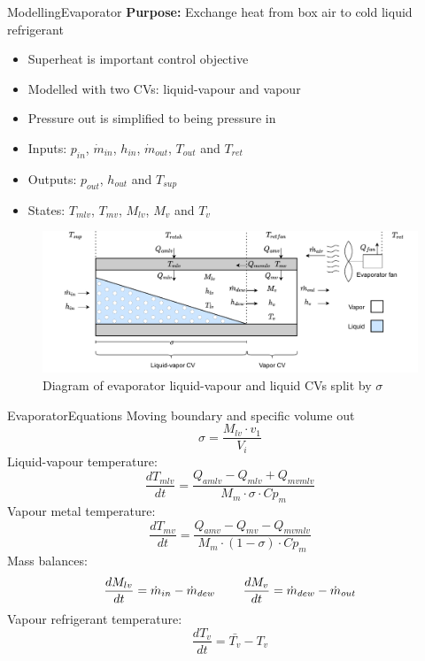 
\begin{frame}{Modelling}{Evaporator}
	\textbf{Purpose:} Exchange heat from box air to cold liquid refrigerant
	\begin{itemize}
		\item Superheat is important control objective
		\item Modelled with two CVs: liquid-vapour and vapour
		\item Pressure out is simplified to being pressure in
		\item Inputs: $p_{in}$, $\dot{m}_{in}$, $h_{in}$, $\dot{m}_{out}$, $T_{out}$ and $T_{ret}$
		\item Outputs: $p_{out}$, $h_{out}$ and $T_{sup}$
		\item States: $T_{mlv}$, $T_{mv}$, $M_{lv}$, $M_{v}$ and $T_{v}$
	\end{itemize}
	\begin{figure}[h!]
		\centering
		\includegraphics[width=1\textwidth]{../Graphics/Evaporator_CV_diagram.pdf}
		\caption{Diagram of evaporator liquid-vapour and liquid CVs split by $\sigma$}
		\label{fig:evap_CV}
	\end{figure}

\end{frame}

\begin{frame}{Evaporator}{Equations}
	Moving boundary and specific volume out
	\begin{equation}
		\sigma = \frac{M_{lv} \cdot v_1}{V_i} \label{eq:Evaporator_boundary}
	\end{equation}
	Liquid-vapour temperature:
	\begin{equation}
		\frac{dT_{mlv}}{dt}  = \frac{Q_{amlv}-Q_{mlv} + Q_{mvmlv}}{M_m \cdot \sigma \cdot Cp_m} \label{eq:evap_dT_ml}
	\end{equation}
	Vapour metal temperature:
	\begin{equation}
		\frac{dT_{mv}}{dt} = \frac{Q_{amv} - Q_{mv} - Q_{mvmlv}}{M_m \cdot (1 - \sigma) \cdot Cp_m} \label{eq:evap_dT_mv}
	\end{equation}
	Mass balances:
	\begin{equation} \label{eq:evap_dMlv}
		\frac{dM_{lv}}{dt} = \dot{m}_{in} - \dot{m}_{dew} \hspace{0.8cm}  \frac{dM_v}{dt} = \dot{m}_{dew} - \dot{m}_{out}
	\end{equation}
	Vapour refrigerant temperature:
	\begin{equation}\label{eq:tv_initial}
		\frac{dT_{v}}{dt} = \bar{T_v} - T_v
	\end{equation}

\end{frame}

